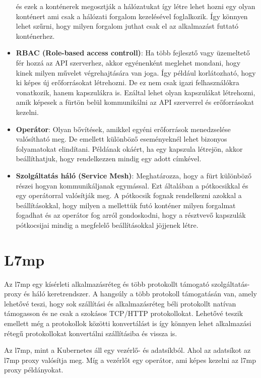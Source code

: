 \begin{itemize}
	és ezek a konténerek megosztják a hálózatukat így létre lehet hozni egy olyan konténert
	ami csak a hálózati forgalom kezelésével foglalkozik. Így könnyen lehet szűrni, hogy
	milyen forgalom juthat csak el az alkalmazást futtató konténerhez. 
	\item \textbf{RBAC (Role-based access controll)}: Ha több fejlesztő vagy üzemeltető
	fér hozzá az API szerverhez, akkor egyénenként meglehet mondani, hogy kinek milyen 
	művelet végrehajtására van joga. Így például korlátozható, hogy ki képes új
	erőforrásokat létrehozni. De ez nem csak igazi felhasználókra vonatkozik, hanem
	kapszulákra is. Ezáltal lehet olyan kapszulákat létrehozni, amik képesek a fürtön
	belül kommunikálni az API szerverrel és erőforrásokat kezelni.  
	\item \textbf{Operátor}: Olyan bővítések, amikkel egyéni erőforrások menedzselése
	valósítható meg. De emellett különböző eseményeknél lehet bizonyos folyamatokat 
	elindítani. Példának okáért, ha egy kapszula létrejön, akkor beállíthatjuk, hogy
	rendelkezzen mindig egy adott címkével.
	\item \textbf{Szolgáltatás háló (Service Mesh)}: Meghatározza, hogy a fürt 
	különböző részei hogyan kommunikáljanak egymással. Ezt általában a pótkocsikkal és 
	egy operátorral valósítják meg. A pótkocsik fognak rendelkezni azokkal a beállításokkal,
	hogy milyen a mellettük futó konténer milyen forgalmat fogadhat és az operátor 
	fog arról gondoskodni, hogy a résztvevő kapszulák pótkocsijai mindig a megfelelő
	beállításokkal jöjjenek létre.
\end{itemize}

\section{L7mp}

Az l7mp egy kísérleti alkalmazásréteg és több protokollt támogató szolgáltatás- 
proxy és háló keretrendszer. A hangsúly a több protokoll támogatásán van, amely
lehetővé teszi, hogy sok szállítási és alkalmazásréteg béli protokollt 
natívan támogasson és ne csak a szokásos TCP/HTTP protokollokat. Lehetővé teszik 
emellett még a protokollok közötti konvertálást is így könnyen lehet alkalmazási
rétegű protokollokat konvertálni szállításiba és vissza is.

Az l7mp, mint a Kubernetes áll egy vezérlő- és adatsíkból. Ahol az adatsíkot 
az l7mp proxy valósítja meg. Míg a vezérlőt egy operátor, ami képes kezelni 
az l7mp proxy példányokat. 

